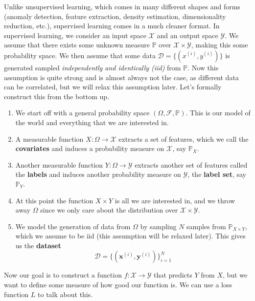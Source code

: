 Unlike unsupervised learning, which comes in many different shapes and forms (anomaly detection, feature extraction, density estimation, dimensionality reduction, etc.), supervised learning comes in a much cleaner format. In supervised learning, we consider an input space $\mathcal{X}$ and an output space $\mathcal{Y}$. We assume that there exists some unknown measure $\mathbb{P}$ over $\mathcal{X} \times \mathcal{Y}$, making this some probability space. We then assume that some data $\mathcal{D} = \{(x^{(i)}, y^{(i)})\}$ is generated sampled \textit{independently and identically (iid)} from $\mathbb{P}$. Now this assumption is quite strong and is almost always not the case, as different data can be correlated, but we will relax this assumption later. Let's formally construct this from the bottom up. 

\begin{enumerate}
  \item We start off with a general probability space $(\Omega, \mathcal{F}, \mathbb{P})$. This is our model of the world and everything that we are interested in. 

  \item A measurable function $X: \Omega \rightarrow \mathcal{X}$ extracts a set of features, which we call the \textbf{covariates} and induces a probability measure on $\mathcal{X}$, say $\mathbb{P}_X$. 

  \item Another measurable function $Y: \Omega \rightarrow \mathcal{Y}$ extracts another set of features called the \textbf{labels} and induces another probability measure on $\mathcal{Y}$, the \textbf{label set}, say $\mathbb{P}_Y$. 

  \item At this point the function $X \times Y$ is all we are interested in, and we throw away $\Omega$ since we only care about the distribution over $\mathcal{X} \times \mathcal{Y}$. 

  \item We model the generation of data from $\Omega$ by sampling $N$ samples from $\mathbb{P}_{X \times Y}$, which we assume to be iid (this assumption will be relaxed later). This gives us the \textbf{dataset} 
    \[\mathcal{D} = \{(\mathbf{x}^{(i)}, \mathbf{y}^{(i)}) \}_{i=1}^N\]
\end{enumerate}

Now our goal is to construct a function $f: \mathcal{X} \rightarrow \mathcal{Y}$ that predicts $Y$ from $X$, but we want to define some measure of how good our function is. We can use a loss function $L$ to talk about this. 

